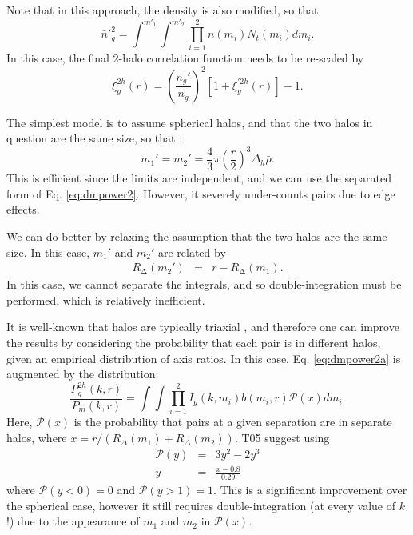\documentclass[5p,aas_macros]{elsarticle}
\begin{document}
Note that in this approach, the density is also modified, so that
\begin{equation}
    \label{eq:ng2}
    \bar{n}'^{2}_g = \int^{m'_1} \int^{m'_2} \prod_{i=1}^2 n(m_i) N_t(m_i) dm_i.
\end{equation}
In this case, the final 2-halo correlation function needs to be re-scaled by
\begin{equation}
    \xi_g^{2h}(r) = \left(\frac{\bar{n}_g'}{\bar{n}_g}\right)^2\left[1+\xi_g^{'2h}(r)\right] - 1.
\end{equation}

The simplest model is to assume spherical halos, and that the two halos in question are the same size, so that  
\citep{Zheng2005}:
\begin{equation}
m_1' = m_2' = \frac{4}{3}\pi\left(\frac{r}{2}\right)^3\Delta_h \bar{\rho}.
\end{equation}
This is efficient since the limits are independent, and we can use the separated form of Eq.  \ref{eq:dmpower2}. However, it severely under-counts pairs due to edge effects. 

We can do better by relaxing the assumption that the two halos are the same size. In this case,  $m_1'$ and $m_2'$ are related by 
\begin{eqnarray}
    R_\mathrm{\Delta}(m_2') &=& r - R_\mathrm{\Delta}(m_1).
\end{eqnarray}
In this case, we cannot separate the integrals, and so double-integration must be performed, which is relatively inefficient.

It is well-known that halos are typically triaxial \citep{Bullock2001a,Taylor2011,Zemp2011}, and therefore one can improve the results by considering the probability that each pair is in different halos, given an empirical distribution of axis ratios. In this case, Eq. \ref{eq:dmpower2a} is augmented by the distribution:
\begin{equation}
    \frac{P_{g}^{2h}(k,r)}{ P_{m}(k,r)}=   \int \int \prod_{i=1}^2  I_g(k,m_i)b(m_i,r) \mathcal{P}(x) dm_i.
\end{equation}
Here, $\mathcal{P}(x)$ is the probability that pairs at a given separation are in separate halos, where $x=r/(R_{\Delta}(m_1) + R_{\Delta}(m_2))$. T05 suggest using
\begin{eqnarray}
    \mathcal{P}(y) &=& 3y^2 - 2y^3 \\
    y &=& \frac{x-0.8}{0.29}
\end{eqnarray}
where $\mathcal{P}(y<0) = 0$ and $\mathcal{P}(y>1) = 1$. This is a significant improvement over the spherical case, however it still requires double-integration (at every value of $k$!) due to the appearance of $m_1$ and $m_2$ in $\mathcal{P}(x)$. 
\end{document}
